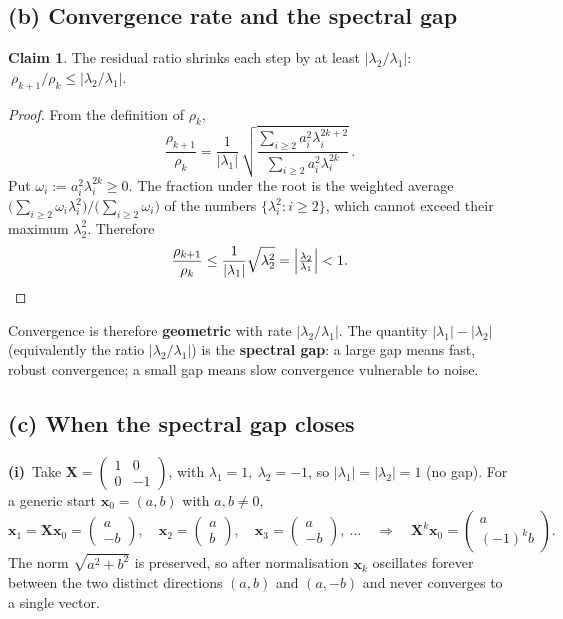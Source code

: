 \documentclass[12pt,a4paper]{article}
\theoremstyle{definition}
\newtheorem*{claim}{Claim}
\newcommand{\Xb}{\mathbf{X}}
\newcommand{\xx}{\mathbf{x}}
\begin{document}
\subsection{(b) Convergence rate and the spectral gap}

\begin{claim}
The residual ratio shrinks each step by at least $|\lambda_2/\lambda_1|$:
$\ \rho_{k+1}/\rho_k\le |\lambda_2/\lambda_1|$.
\end{claim}
\begin{proof}
From the definition of $\rho_k$,
\[
\frac{\rho_{k+1}}{\rho_k}
=\frac{1}{|\lambda_1|}\,
\sqrt{\frac{\sum_{i\ge2} a_i^2\lambda_i^{2k+2}}{\sum_{i\ge2} a_i^2\lambda_i^{2k}}}\, .
\]
Put $\omega_i:=a_i^2\lambda_i^{2k}\ge0$. The fraction under the root is the
weighted average $\bigl(\sum_{i\ge2}\omega_i\lambda_i^{2}\bigr)\big/\bigl(\sum_{i\ge2}\omega_i\bigr)$
of the numbers $\{\lambda_i^2:i\ge2\}$, which cannot exceed their maximum
$\lambda_2^{2}$. Therefore
\[
\frac{\rho_{k+1}}{\rho_k}\le\frac{1}{|\lambda_1|}\sqrt{\lambda_2^{2}}
=\Bigl|\tfrac{\lambda_2}{\lambda_1}\Bigr|<1 .
\]
\end{proof}
Convergence is therefore \textbf{geometric} with rate $|\lambda_2/\lambda_1|$.
The quantity $|\lambda_1|-|\lambda_2|$ (equivalently the ratio
$|\lambda_2/\lambda_1|$) is the \textbf{spectral gap}: a large gap means fast,
robust convergence; a small gap means slow convergence vulnerable to noise.

\subsection{(c) When the spectral gap closes}

\textbf{(i)}~Take $\displaystyle \Xb=\begin{pmatrix}1&0\\0&-1\end{pmatrix}$,
with $\lambda_1=1,\ \lambda_2=-1$, so $|\lambda_1|=|\lambda_2|=1$ (no gap).
For a generic start $\xx_0=(a,b)$ with $a,b\ne0$,
\[
\xx_1=\Xb\xx_0=\begin{pmatrix}a\\-b\end{pmatrix},\quad
\xx_2=\begin{pmatrix}a\\ b\end{pmatrix},\quad
\xx_3=\begin{pmatrix}a\\-b\end{pmatrix},\ \dots
\quad\Longrightarrow\quad
\Xb^{k}\xx_0=\begin{pmatrix}a\\ (-1)^{k}b\end{pmatrix}.
\]
The norm $\sqrt{a^2+b^2}$ is preserved, so after normalisation $\xx_k$
oscillates forever between the two distinct directions
$(a,b)$ and $(a,-b)$ and never converges to a single vector.
\end{document}
